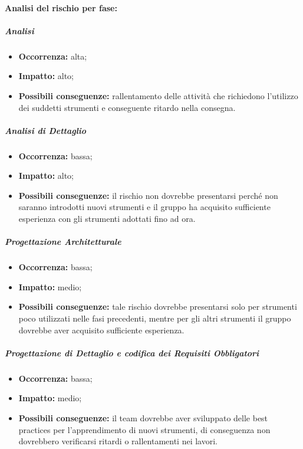 \documentclass[../PianoProgetto.tex]{subfiles}
\begin{document}
	\paragraph*{Analisi del rischio per fase:} 
	
		\subparagraph*{Analisi}
			\begin{itemize}[label={-}]
				\item \textbf{Occorrenza:} alta;
				\item \textbf{Impatto:} alto;
				\item \textbf{Possibili conseguenze:} rallentamento delle attività che richiedono l'utilizzo dei suddetti strumenti e conseguente ritardo nella consegna.
			\end{itemize}
			
		\subparagraph*{Analisi di Dettaglio}
			\begin{itemize}[label={-}]
				\item \textbf{Occorrenza:} bassa;
				\item \textbf{Impatto:} alto;
				\item \textbf{Possibili conseguenze:} il rischio non dovrebbe presentarsi perché non saranno introdotti nuovi strumenti e il gruppo ha acquisito sufficiente esperienza con gli strumenti adottati fino ad ora.
			\end{itemize}
			
		\subparagraph*{Progettazione Architetturale}
			\begin{itemize}[label={-}]
				\item \textbf{Occorrenza:} bassa;
				\item \textbf{Impatto:} medio;
				\item \textbf{Possibili conseguenze:} tale rischio dovrebbe presentarsi solo per strumenti poco utilizzati nelle fasi precedenti, mentre per gli altri strumenti il gruppo dovrebbe aver acquisito sufficiente esperienza.
			\end{itemize}
			
		\subparagraph*{Progettazione di Dettaglio e codifica dei Requisiti Obbligatori}
			\begin{itemize}[label={-}]
				\item \textbf{Occorrenza:} bassa;
				\item \textbf{Impatto:} medio;
				\item \textbf{Possibili conseguenze:} il team dovrebbe aver sviluppato delle best practices per l'apprendimento di nuovi strumenti, di conseguenza non dovrebbero verificarsi ritardi o rallentamenti nei lavori.
			\end{itemize}
			
\end{document}
